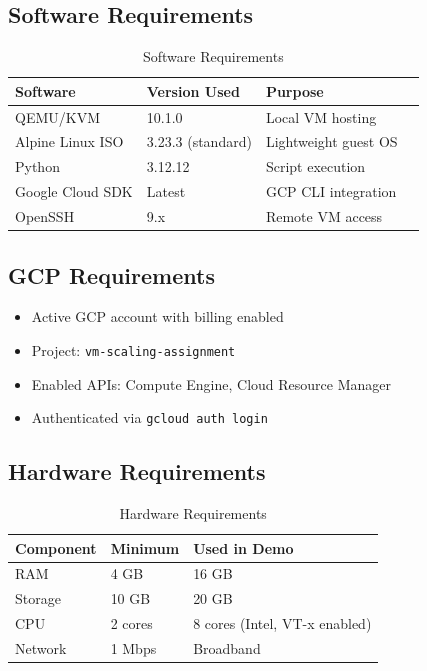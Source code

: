 \documentclass[12pt,a4paper]{article}
\begin{document}
\subsection{Software Requirements}

\begin{table}[H]
\centering
\begin{tabular}{llll}
\toprule
\textbf{Software} & \textbf{Version Used} & \textbf{Purpose} \\
\midrule
QEMU/KVM          & 10.1.0                & Local VM hosting \\
Alpine Linux ISO  & 3.23.3 (standard)     & Lightweight guest OS \\
Python            & 3.12.12               & Script execution \\
Google Cloud SDK  & Latest                & GCP CLI integration \\
OpenSSH           & 9.x                   & Remote VM access \\
\bottomrule
\end{tabular}
\caption{Software Requirements}
\end{table}

\subsection{GCP Requirements}

\begin{itemize}
    \item Active GCP account with billing enabled
    \item Project: \texttt{vm-scaling-assignment}
    \item Enabled APIs: Compute Engine, Cloud Resource Manager
    \item Authenticated via \texttt{gcloud auth login}
\end{itemize}

\subsection{Hardware Requirements}

\begin{table}[H]
\centering
\begin{tabular}{lll}
\toprule
\textbf{Component} & \textbf{Minimum} & \textbf{Used in Demo} \\
\midrule
RAM      & 4 GB    & 16 GB \\
Storage  & 10 GB   & 20 GB \\
CPU      & 2 cores & 8 cores (Intel, VT-x enabled) \\
Network  & 1 Mbps  & Broadband \\
\bottomrule
\end{tabular}
\caption{Hardware Requirements}
\end{table}
\end{document}
